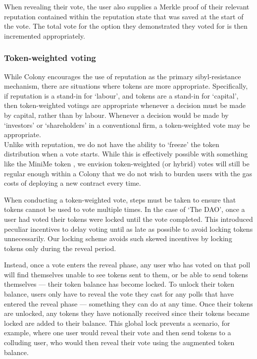 When revealing their vote, the user also supplies a Merkle proof of their relevant reputation contained within the reputation state that was saved at the start of the vote. The total vote for the option they demonstrated they voted for is then incremented appropriately.

\subsubsection*{Token-weighted voting}

While Colony encourages the use of reputation as the primary sibyl-resistance mechanism, there are situations where tokens are more appropriate. Specifically, if reputation is a stand-in for `labour', and tokens are a stand-in for `capital', then token-weighted votings are appropriate whenever a decision must be made by capital, rather than by labour. Whenever a decision would be made by `investors' or `shareholders' in a conventional firm, a token-weighted vote may be appropriate. \\

Unlike with reputation, we do not have the ability to `freeze' the token distribution when a vote starts. While this is effectively possible with something like the MiniMe token \cite{minime}, we envision token-weighted (or hybrid) votes will still be regular enough within a Colony that we do not wish to burden users with the gas costs of deploying a new contract every time.

When conducting a token-weighted vote, steps must be taken to ensure that tokens cannot be used to vote multiple times. In the case of `The DAO', once a user had voted their tokens were locked until the vote completed. This introduced peculiar incentives to delay voting until as late as possible to avoid locking tokens unnecessarily.  Our locking scheme avoids such skewed incentives by locking tokens only during the reveal period.

Instead, once a vote enters the reveal phase, any user who has voted on that poll will find themselves unable to see tokens sent to them, or be able to send tokens themselves --- their token balance has become locked. To unlock their token balance, users only have to reveal the vote they cast for any polls that have entered the reveal phase --- something they can do at any time. Once their tokens are unlocked, any tokens they have notionally received since their tokens became locked are added to their balance. This global lock prevents a scenario, for example, where one user would reveal their vote and then send tokens to a colluding user, who would then reveal their vote using the augmented token balance.


